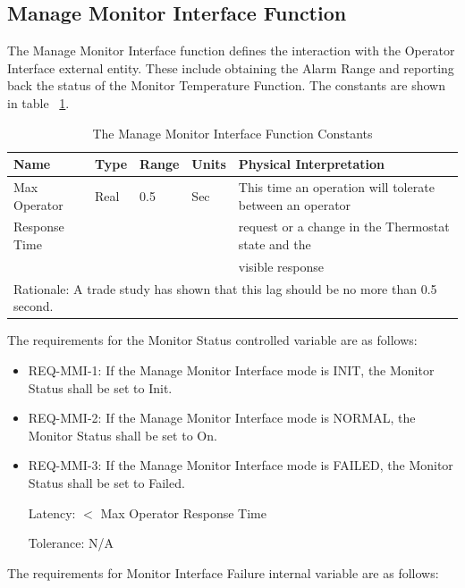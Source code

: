 \subsection{Manage Monitor Interface Function}
\label{subsec:MMIF}

The Manage Monitor Interface function defines the interaction with the Operator Interface
external entity. These include obtaining the Alarm Range and reporting back the status of the
Monitor Temperature Function. The constants are shown in table ~\ref{tab:MMIF-constants}.

\begin{table}
\begin{tabular}{|l|l|l|l|l|}
\hline
Name & Type & Range & Units & Physical Interpretation \\\hline
Max Operator & Real & 0.5 & Sec & This time an operation will tolerate between an operator \\
Response Time &  &  &  & request or a change in the Thermostat state and the \\
  &  &  &  & visible response \\\hline
\multicolumn{5}{|l|}{Rationale: A trade study has shown that this lag should be no more than 0.5 second.} \\\hline
\end{tabular}
\caption{The Manage Monitor Interface Function Constants}
\label{tab:MMIF-constants}
\end{table}

The requirements for the Monitor Status controlled variable are as follows:

\begin{itemize}
\item REQ-MMI-1: If the Manage Monitor Interface mode is INIT, the Monitor Status shall be
      set to Init.
\item REQ-MMI-2: If the Manage Monitor Interface mode is NORMAL, the Monitor Status
      shall be set to On.
\item REQ-MMI-3: If the Manage Monitor Interface mode is FAILED, the Monitor Status
      shall be set to Failed.

      Latency: $<$ Max Operator Response Time

      Tolerance: N/A
\end{itemize}

The requirements for Monitor Interface Failure internal variable are as follows:

